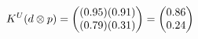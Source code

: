 \documentclass[preview]{standalone}
\begin{document}
\begin{align*}
\special{dvisvgm:raw <g id='unique000'>}K^U(d \otimes p) = \begin{pmatrix} (0.95)(0.91) \\ (0.79)(0.31) \end{pmatrix} = \begin{pmatrix} 0.86 \\ 0.24 \end{pmatrix}\special{dvisvgm:raw </g>}
\end{align*}
\end{document}
